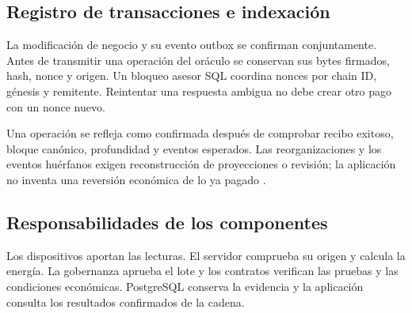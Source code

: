 \subsection{Registro de transacciones e indexación}
La modificación de negocio y su evento outbox se confirman conjuntamente. Antes de transmitir una operación del oráculo se conservan sus bytes firmados, hash, nonce y origen. Un bloqueo asesor SQL coordina nonces por chain ID, génesis y remitente. Reintentar una respuesta ambigua no debe crear otro pago con un nonce nuevo.

Una operación se refleja como confirmada después de comprobar recibo exitoso, bloque canónico, profundidad y eventos esperados. Las reorganizaciones y los eventos huérfanos exigen reconstrucción de proyecciones o revisión; la aplicación no inventa una reversión económica de lo ya pagado \citep{architecture,blockchain}.

\subsection{Responsabilidades de los componentes}
Los dispositivos aportan las lecturas. El servidor comprueba su origen y calcula la energía. La gobernanza aprueba el lote y los contratos verifican las pruebas y las condiciones económicas. PostgreSQL conserva la evidencia y la aplicación consulta los resultados confirmados de la cadena.
